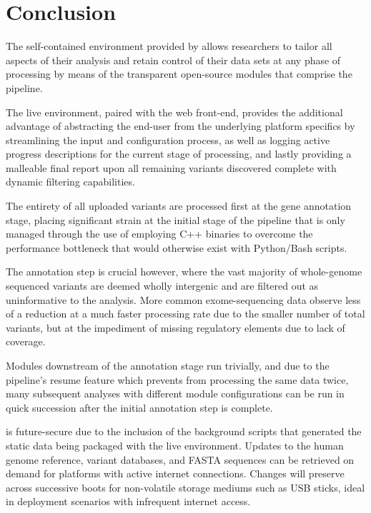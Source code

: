 
\section{Conclusion}

The self-contained environment provided by \app allows researchers to tailor all aspects of their analysis and retain control of their data sets at any phase of processing by means of the transparent open-source modules that comprise the pipeline. 

The live environment, paired with the web front-end, provides the additional advantage of abstracting the end-user from the underlying platform specifics by streamlining the input and configuration process, as well as logging active progress descriptions for the current stage of processing, and lastly providing a malleable final report upon all remaining variants discovered complete with dynamic filtering capabilities.

The entirety of all uploaded variants are processed first at the gene annotation stage, placing significant strain at the initial stage of the pipeline that is only managed through the use of employing C++ binaries to overcome the performance bottleneck that would otherwise exist with Python/Bash scripts.

The annotation step is crucial however, where the vast majority of whole-genome sequenced variants are deemed wholly intergenic and are filtered out as uninformative to the analysis. More common exome-sequencing data observe less of a reduction at a much faster processing rate due to the smaller number of total variants, but at the impediment of missing regulatory elements due to lack of coverage.

Modules downstream of the annotation stage run trivially, and due to the pipeline's resume feature which prevents \app from processing the same data twice, many subsequent analyses with different module configurations can be run in quick succession after the initial annotation step is complete.

\app is future-secure due to the inclusion of the background scripts that generated the static data being packaged with the live environment. Updates to the human genome reference, variant databases, and FASTA sequences can be retrieved on demand for platforms with active internet connections. Changes will preserve across successive boots for non-volatile storage mediums such as USB sticks, ideal in deployment scenarios with infrequent internet access.

